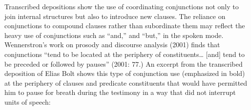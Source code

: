 \begin{styleStandard}
Transcribed depositions show the use of coordinating conjunctions not only to join internal structures but also to introduce new clauses. The reliance on conjunctions to compound clauses rather than subordinate them may reflect the heavy use of conjunctions such as “and,” and “but,” in the spoken mode. Wennerstron’s work on prosody and discourse analysis (2001) finds that conjunctions “tend to be located at the periphery of constituents… [and] tend to be preceded or followed by pauses” (2001: 77.) An excerpt from the transcribed deposition of Elias Bolt shows this type of conjunction use (emphasized in bold) at the periphery of clauses and predicate constituents that would have permitted him to pause for breath during the testimony in a way that did not interrupt units of speech:
\end{styleStandard}


